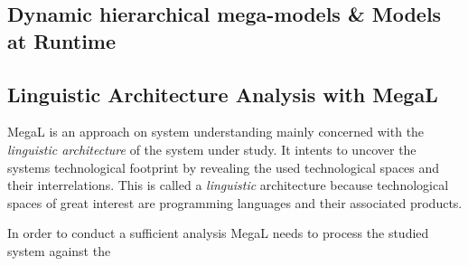 \subsection{Dynamic hierarchical mega-models \& Models at Runtime}
\subsection{Linguistic Architecture Analysis with MegaL}
MegaL\cite{MEGAL1}\cite{MEGAL2} is an approach on system understanding mainly concerned with the \textit{linguistic architecture} of the system under study. It intents to uncover the systems technological footprint by revealing the used technological spaces and their interrelations. This is called a \textit{linguistic} architecture because technological spaces of great interest are programming languages and their associated products.

In order to conduct a sufficient analysis MegaL needs to process the studied system against the 